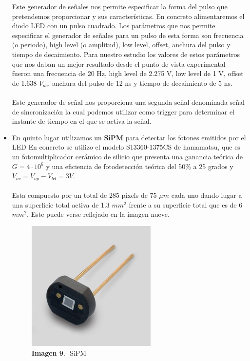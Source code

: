 \documentclass[11pt, a4paper]{article}
\begin{document}
\begin{itemize}
\newpage
Este generador de señales nos permite especificar la forma del pulso que pretendemos proporcionar y sus características. En concreto alimentaremos el diodo LED con un pulso cuadrado. Los parámetros que nos permite especificar el generador de señales para un pulso de esta forma son frecuencia (o periodo), high level (o amplitud), low level, offset, anchura del pulso y tiempo de decaimiento. Para nuestro estudio los valores de estos parámetros que nos daban un mejor resultado desde el punto de vista experimental fueron una frecuencia de 20 Hz, high level de 2.275 V, low level de 1 V, offset de 1.638 $V_{dc}$, anchura del pulso de 12 ns y tiempo de decaimiento de 5 ns.

\paragraph {}
Este generador de señal nos proporciona una segunda señal denominada señal de sincronización la cual podemos utilizar como trigger para determinar el instante de tiempo en el que se activa la señal.

\item {} En quinto lugar utilizamos un \textbf{SiPM} para detectar los fotones emitidos por el LED 
\newline
En concreto se utilizo el modelo S13360-1375CS de hamamatsu, que es un fotomultiplicador cerámico de silicio  que presenta una ganancia teórica de $G=4 \cdotp 10^6$ y una eficiencia de fotodetección teórica del 50\% a 25 grados y $V_{ov}=V_{op}-V_{bd}=3V$.  

\paragraph {}
Esta compuesto por un total de 285 pixels de 75 $\mu m$ cada uno dando lugar a una superficie total activa de 1.3 $mm^2$ frente a su superficie total que es de 6 $mm^2$. Este puede verse reflejado en la imagen nueve.

\begin{figure}[hbtp]
\centering
\includegraphics[scale=0.25]{SiPM.png}
\caption{\textbf{Imagen 9}.- SiPM}
\end{figure}


\end{itemize}
\end{document}
